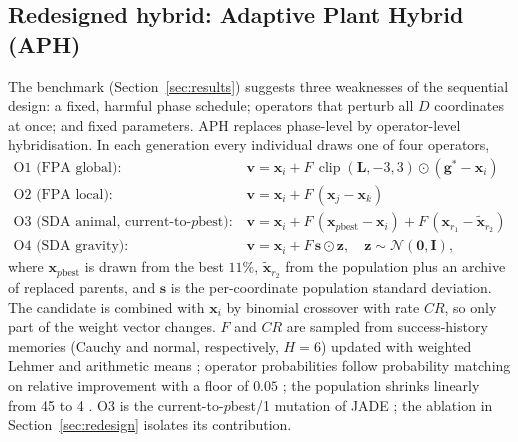 \documentclass[preprint,12pt]{elsarticle}
\newcommand{\clip}{\operatorname{clip}}
\begin{document}
\subsection{Redesigned hybrid: Adaptive Plant Hybrid (APH)}\label{sec:aph}
The benchmark (Section~\ref{sec:results}) suggests three weaknesses of the sequential design: a fixed, harmful phase schedule; operators that perturb all $D$ coordinates at once; and fixed parameters. APH replaces phase-level by operator-level hybridisation. In each generation every individual draws one of four operators,
\begin{align*}
\text{O1 (FPA global)}:\ & \mathbf{v}=\mathbf{x}_i+F\,\clip(\mathbf{L},-3,3)\odot(\mathbf{g}^{*}-\mathbf{x}_i)\\
\text{O2 (FPA local)}:\ & \mathbf{v}=\mathbf{x}_i+F\,(\mathbf{x}_j-\mathbf{x}_k)\\
\text{O3 (SDA animal, current-to-}p\text{best)}:\ & \mathbf{v}=\mathbf{x}_i+F\,(\mathbf{x}_{p\mathrm{best}}-\mathbf{x}_i)+F\,(\mathbf{x}_{r_1}-\tilde{\mathbf{x}}_{r_2})\\
\text{O4 (SDA gravity)}:\ & \mathbf{v}=\mathbf{x}_i+F\,\mathbf{s}\odot\mathbf{z},\quad \mathbf{z}\sim\mathcal{N}(\mathbf{0},\mathbf{I}),
\end{align*}
where $\mathbf{x}_{p\mathrm{best}}$ is drawn from the best $11\%$, $\tilde{\mathbf{x}}_{r_2}$ from the population plus an archive of replaced parents, and $\mathbf{s}$ is the per-coordinate population standard deviation. The candidate is combined with $\mathbf{x}_i$ by binomial crossover with rate $CR$, so only part of the weight vector changes. $F$ and $CR$ are sampled from success-history memories (Cauchy and normal, respectively, $H=6$) updated with weighted Lehmer and arithmetic means \citep{tanabe2013shade}; operator probabilities follow probability matching on relative improvement with a floor of $0.05$ \citep{thierens2005aos}; the population shrinks linearly from 45 to 4 \citep{tanabe2014lshade}. O3 is the current-to-$p$best/1 mutation of JADE \citep{zhang2009jade}; the ablation in Section~\ref{sec:redesign} isolates its contribution.
\end{document}
